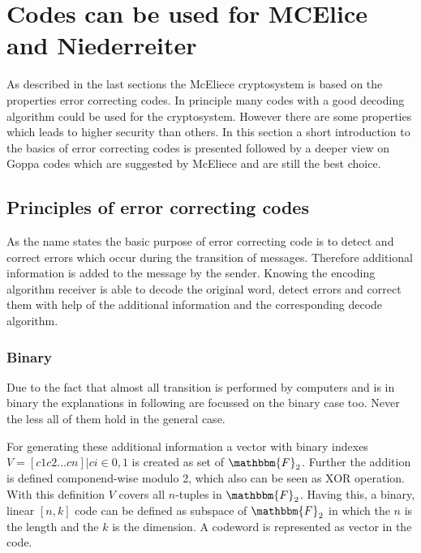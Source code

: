 \section{Codes can be used for MCElice and Niederreiter} 
As described in the last sections the McEliece cryptosystem is based on the properties error correcting codes. In principle many codes with a good decoding algorithm could be used for the cryptosystem. However there are some properties which leads to higher security than others. In this section a short introduction to the basics of error correcting codes is presented followed by a deeper view on Goppa codes which are suggested by McEliece and are still the best choice.

\subsection*{Principles of error correcting codes}
As the name states the basic purpose of error correcting code is to detect and correct errors which occur during the transition of messages. Therefore additional information is added to the message by the sender. Knowing the encoding algorithm receiver is able to decode the original word, detect errors and correct them with help of the additional information and the corresponding decode algorithm. 
\subsubsection*{Binary} Due to the fact that almost all transition is performed by computers and is in binary the explanations in following are focussed on the binary case too. Never the less all of them hold in the general case. 

For generating these additional information a vector with binary indexes $V = {[c1 c2...cn] |ci \in {0, 1}}$ is created as set of $\mathbbm{F}_2$. Further the addition is defined componend-wise modulo 2, which also can be seen as XOR operation. With this definition $V$ covers all $n$-tuples in $\mathbbm{F}_2$. 
Having this, a binary, linear $[n, k]$ code can be defined as subspace of $\mathbbm{F}_2$ in which the $n$ is the length and the $k$ is the dimension. A codeword is represented as vector in the code.
 


